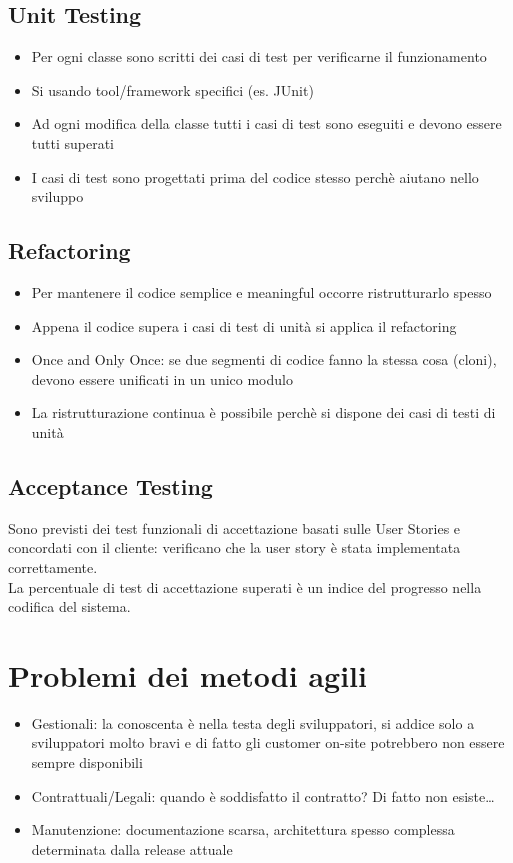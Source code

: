 \documentclass[12pt, a4paper]{report}
\begin{document}
\subsection{Unit Testing}
\begin{itemize}
    \item Per ogni classe sono scritti dei casi di test per verificarne il funzionamento
    \item Si usando tool/framework specifici (es. JUnit)
    \item Ad ogni modifica della classe tutti i casi di test sono eseguiti e devono essere tutti superati
    \item I casi di test sono progettati prima del codice stesso perchè aiutano nello sviluppo
\end{itemize}
\subsection{Refactoring}
\begin{itemize}
    \item Per mantenere il codice semplice e meaningful occorre ristrutturarlo spesso
    \item Appena il codice supera i casi di test di unità si applica il refactoring
    \item Once and Only Once: se due segmenti di codice fanno la stessa cosa (cloni), devono essere unificati in un unico modulo
    \item La ristrutturazione continua è possibile perchè si dispone dei casi di testi di unità
\end{itemize}
\subsection{Acceptance Testing}
Sono previsti dei test funzionali di accettazione basati sulle User Stories e concordati con il cliente: verificano che la user story è stata implementata correttamente.\\
La percentuale di test di accettazione superati è un indice del progresso nella codifica del sistema.
\section{Problemi dei metodi agili}
\begin{itemize}
    \item Gestionali: la conoscenta è nella testa degli sviluppatori, si addice solo a sviluppatori molto bravi e di fatto gli customer on-site potrebbero non essere sempre disponibili 
    \item Contrattuali/Legali: quando è soddisfatto il contratto? Di fatto non esiste\dots
    \item Manutenzione: documentazione scarsa, architettura spesso complessa determinata dalla release attuale
\end{itemize}
\end{document}

